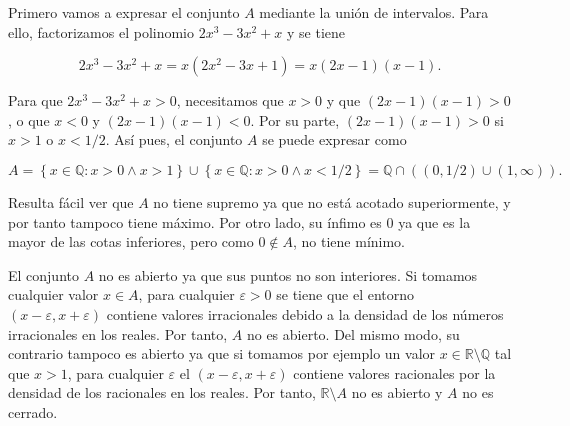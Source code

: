 \documentclass[
  spanish,
  a4paper,
]{scrreport}
\theoremstyle{definition}
\theoremstyle{remark}
\begin{document}
\begin{tcolorbox}[enhanced jigsaw, arc=.35mm, bottomrule=.15mm, bottomtitle=1mm, breakable, colback=white, colbacktitle=quarto-callout-tip-color!10!white, colframe=quarto-callout-tip-color-frame, coltitle=black, left=2mm, leftrule=.75mm, opacityback=0, opacitybacktitle=0.6, rightrule=.15mm, title=\textcolor{quarto-callout-tip-color}{\faLightbulb}\hspace{0.5em}{Solución}, titlerule=0mm, toprule=.15mm, toptitle=1mm]

Primero vamos a expresar el conjunto \(A\) mediante la unión de
intervalos. Para ello, factorizamos el polinomio \(2x^3-3x^2+x\) y se
tiene

\[
2x^3-3x^2+x = x(2x^2-3x+1) = x(2x-1)(x-1).
\]

Para que \(2x^3-3x^2+x>0\), necesitamos que \(x>0\) y que
\((2x-1)(x-1)>0\), o que \(x<0\) y \((2x-1)(x-1)<0\). Por su parte,
\((2x-1)(x-1)>0\) si \(x>1\) o \(x<1/2\). Así pues, el conjunto \(A\) se
puede expresar como

\[
A = \left\{x\in\mathbb{Q}: x>0 \land x>1 \right\} \cup \left\{x\in\mathbb{Q}: x>0 \land x<1/2 \right\} = \mathbb{Q}\cap((0,1/2) \cup (1,\infty)).
\]

Resulta fácil ver que \(A\) no tiene supremo ya que no está acotado
superiormente, y por tanto tampoco tiene máximo. Por otro lado, su
ínfimo es \(0\) ya que es la mayor de las cotas inferiores, pero como
\(0\not\in A\), no tiene mínimo.

El conjunto \(A\) no es abierto ya que sus puntos no son interiores. Si
tomamos cualquier valor \(x\in A\), para cualquier \(\varepsilon>0\) se
tiene que el entorno \((x-\varepsilon, x+\varepsilon)\) contiene valores
irracionales debido a la densidad de los números irracionales en los
reales. Por tanto, \(A\) no es abierto. Del mismo modo, su contrario
tampoco es abierto ya que si tomamos por ejemplo un valor
\(x\in \mathbb{R}\setminus \mathbb{Q}\) tal que \(x>1\), para cualquier
\(\varepsilon\) el \((x-\varepsilon, x+\varepsilon)\) contiene valores
racionales por la densidad de los racionales en los reales. Por tanto,
\(\mathbb{R}\setminus A\) no es abierto y \(A\) no es cerrado.


\end{tcolorbox}
\end{document}
